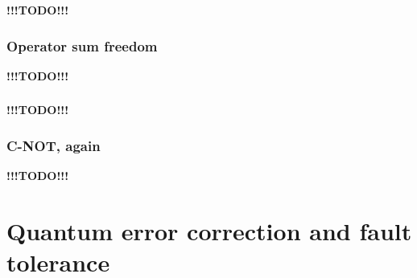 \documentclass[fleqn]{article}
\let\oldsection\section
\renewcommand\section{\clearpage\oldsection}
\begin{document}
\textbf{!!!TODO!!!}

\hypertarget{operator-sum-freedom}{%
\subsubsection{Operator sum freedom}\label{operator-sum-freedom}}

\textbf{!!!TODO!!!}

\hypertarget{section-17}{%
\subsubsection{}\label{section-17}}

\textbf{!!!TODO!!!}

\hypertarget{c-not-again}{%
\subsubsection{C-NOT, again}\label{c-not-again}}

\textbf{!!!TODO!!!}

\hypertarget{chapter11}{%
\section{Quantum error correction and fault tolerance}\label{chapter11}}
\end{document}
